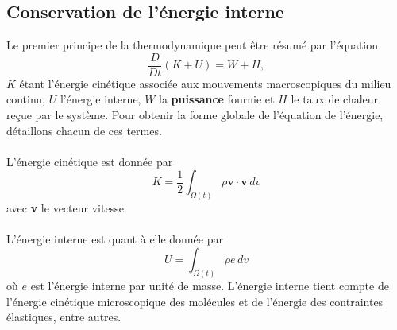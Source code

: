 \subsection{Conservation de l'énergie interne}
Le premier principe de la thermodynamique peut être résumé par l'équation \begin{equation}\label{eq:premier_principe}\frac{D}{Dt}(K+U)=W+H,\end{equation} $K$ étant l'énergie cinétique associée aux mouvements macroscopiques du milieu continu, $U$ l'énergie interne, $W$ la \textbf{puissance} fournie et $H$ le taux de chaleur reçue par le système. Pour obtenir la forme globale de l'équation de l'énergie, détaillons chacun de ces termes.
\paragraph{}
L'énergie cinétique est donnée par $$K=\frac{1}{2}\int_{\Omega (t)}\rho\textbf{v}\cdot\textbf{v}\,dv$$ avec \textbf{v} le vecteur vitesse.
\paragraph{}
L'énergie interne est quant à elle donnée par $$U=\int_{\Omega (t)}\rho e\,dv$$ où $e$ est l'énergie interne par unité de masse. L'énergie interne tient compte de l'énergie cinétique microscopique des molécules et de l'énergie des contraintes élastiques, entre autres.
